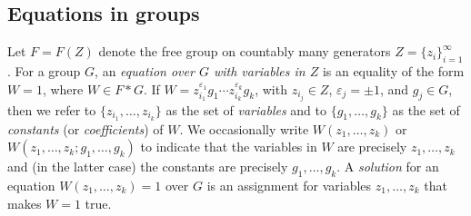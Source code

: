 \documentclass{jgcc}
\def\SIVP{{\mathbf{SIVP}}}
\def\BDD{{\mathbf{BDD}}}
\def\GAPSVP{{\mathbf{GapSVP}}}
\begin{document}



\subsection{Equations in groups}

Let $F = F(Z)$ denote the free group on countably many generators 
$Z = \{z_i\}_{i=1}^\infty$. For a group $G$, an 
\emph{equation over $G$ with variables in $Z$} is an equality of 
the form $W = 1$, where $W \in F\ast G$. If 
$W = z_{i_1}^{\varepsilon_1}g_1\cdots z_{i_k}^{\varepsilon_k} g_k$, 
with $z_{i_j}\in Z$, $\varepsilon_j=\pm 1$, and $g_j\in G$,
then we refer to $\{z_{i_1},\ldots,z_{i_k}\}$ as the set of \emph{variables} and 
to $\{g_1,\ldots,g_k\}$ as the set of \emph{constants} (or \emph{coefficients}) of $W$. 
We occasionally write $W(z_1,\ldots,z_k)$ or $W(z_1,\ldots,z_k;g_1,\ldots,g_k)$ 
to indicate that the variables in $W$ are precisely $z_1,\ldots,z_k$ and (in the latter case)
the constants are precisely $g_1,\ldots, g_k$. 
A \emph{solution} for an equation $W(z_1,\ldots,z_k)=1$ over $G$ is
an assignment for variables $z_1,\ldots,z_k$ that makes $W=1$ true. 
\end{document}
